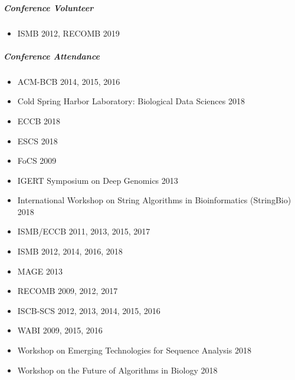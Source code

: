 \documentclass[10pt,letterpaper]{article}
\begin{document}
\subparagraph{Conference Volunteer}
\begin{itemize}
	\item ISMB 2012, RECOMB 2019
\end{itemize}

\subparagraph{Conference Attendance}
\begin{itemize}
	\item ACM-BCB 2014, 2015, 2016
	\item Cold Spring Harbor Laboratory: Biological Data Sciences 2018
	\item ECCB 2018
	\item ESCS 2018
	\item FoCS 2009
	\item IGERT Symposium on Deep Genomics 2013
	\item International Workshop on String Algorithms in Bioinformatics (StringBio) 2018
	\item ISMB/ECCB 2011, 2013, 2015, 2017
	\item ISMB 2012, 2014, 2016, 2018
	\item MAGE 2013
	\item RECOMB 2009, 2012, 2017
	\item ISCB-SCS 2012, 2013, 2014, 2015, 2016
	\item WABI 2009, 2015, 2016
	\item Workshop on Emerging Technologies for Sequence Analysis 2018
	\item Workshop on the Future of Algorithms in Biology 2018
\end{itemize}
\end{document}
